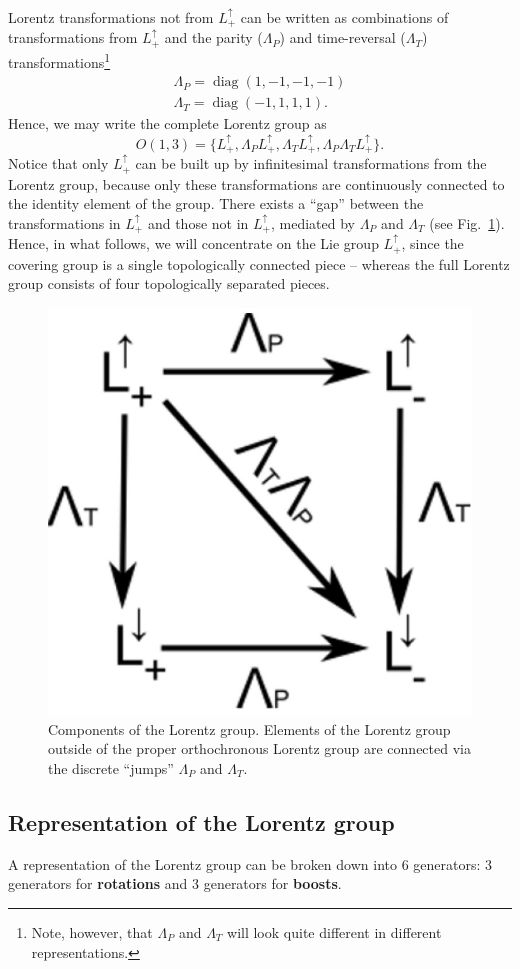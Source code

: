 \documentclass[11pt]{article}
\numberwithin{equation}{section}
\DeclareMathOperator{\diag}{diag}
\begin{document}
Lorentz transformations not from $L_+^\uparrow$ can be written as combinations of transformations from $L_+^\uparrow$ and the parity ($\Lambda_P$) and time-reversal ($\Lambda_T$) transformations\footnote{Note, however, that $\Lambda_P$ and $\Lambda_T$ will look quite different in different representations.}
\begin{align}
\Lambda_P = \diag(1,-1,-1,-1) \\
\Lambda_T = \diag(-1,1,1,1). \label{eq:parity-time-reversal-operators}
\end{align}
Hence, we may write the complete Lorentz group as
\begin{equation}
O(1,3) = \{L_+^\uparrow, \Lambda_P L_+^\uparrow, \Lambda_T L_+^\uparrow, \Lambda_P \Lambda_T L_+^\uparrow \}.
\end{equation}
Notice that only $L_+^\uparrow$ can be built up by infinitesimal transformations from the Lorentz group, because only these transformations are continuously connected to the identity element of the group. There exists a ``gap'' between the transformations in $L_+^\uparrow$ and those not in $L_+^\uparrow$, mediated by $\Lambda_P$ and $\Lambda_T$ (see Fig.~\ref{fig:lorentz-group-components}). Hence, in what follows, we will concentrate on the Lie group $L_+^\uparrow$, since the covering group is a single topologically connected piece -- whereas the full Lorentz group consists of four topologically separated pieces.

\begin{figure}
\begin{center}
\includegraphics[width=0.3\columnwidth]{figures/lorentz-group-components.jpg}  
\end{center}
\caption{Components of the Lorentz group. Elements of the Lorentz group outside of the proper orthochronous Lorentz group are connected via the discrete ``jumps'' $\Lambda_P$ and $\Lambda_T$.}
\label{fig:lorentz-group-components}
\end{figure}

\subsection{Representation of the Lorentz group}
A representation of the Lorentz group can be broken down into 6 generators: 3 generators for \textbf{rotations} and 3 generators for \textbf{boosts}.
\end{document}
